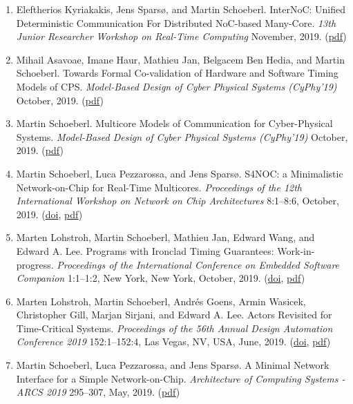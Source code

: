 \begin{enumerate}
\item Eleftherios Kyriakakis, Jens Spars{\o}, and Martin Schoeberl.
 InterNoC: Unified Deterministic Communication For Distributed NoC-based Many-Core.
 \emph{13th Junior Researcher Workshop on Real-Time Computing} November, 2019.
(\href{https://www.jopdesign.com/doc/internoc-jrwrtc.pdf}{pdf})

\item Mihail Asavoae, Imane Haur, Mathieu Jan, Belgacem Ben Hedia, and Martin Schoeberl.
 Towards Formal Co-validation of Hardware and Software Timing Models of CPS.
 \emph{Model-Based Design of Cyber Physical Systems (CyPhy'19)} October, 2019.
(\href{https://www.jopdesign.com/doc/lipsi-models.pdf}{pdf})

\item Martin Schoeberl.
 Multicore Models of Communication for Cyber-Physical Systems.
 \emph{Model-Based Design of Cyber Physical Systems (CyPhy'19)} October, 2019.
(\href{https://www.jopdesign.com/doc/modcom-cyphy.pdf}{pdf})

\item Martin Schoeberl, Luca Pezzarossa, and Jens Spars{\o}.
 S4NOC: a Minimalistic Network-on-Chip for Real-Time Multicores.
 \emph{Proceedings of the 12th International Workshop on Network on Chip Architectures} 8:1--8:6, October, 2019.
(\href{http://dx.doi.org/10.1145/3356045.3360714}{doi}, \href{https://www.jopdesign.com/doc/s4nocimpl.pdf}{pdf})

\item Marten Lohstroh, Martin Schoeberl, Mathieu Jan, Edward Wang, and Edward A. Lee.
 Programs with Ironclad Timing Guarantees: Work-in-progress.
 \emph{Proceedings of the International Conference on Embedded Software Companion} 1:1--1:2, New York, New York, October, 2019.
(\href{http://dx.doi.org/10.1145/3349568.3351553}{doi}, \href{https://www.jopdesign.com/doc/reactorsRT.pdf}{pdf})

\item Marten Lohstroh, Martin Schoeberl, Andr{\'e}s Goens, Armin Wasicek, Christopher Gill, Marjan Sirjani, and Edward A. Lee.
 Actors Revisited for Time-Critical Systems.
 \emph{Proceedings of the 56th Annual Design Automation Conference 2019} 152:1--152:4, Las Vegas, NV, USA, June, 2019.
(\href{http://dx.doi.org/10.1145/3316781.3323469}{doi}, \href{https://www.jopdesign.com/doc/actorsRevisited.pdf}{pdf})

\item Martin Schoeberl, Luca Pezzarossa, and Jens Spars{\o}.
 A Minimal Network Interface for a Simple Network-on-Chip.
 \emph{Architecture of Computing Systems - ARCS 2019} 295--307, May, 2019.
(\href{https://www.jopdesign.com/doc/s4nocni.pdf}{pdf})


\end{enumerate}
